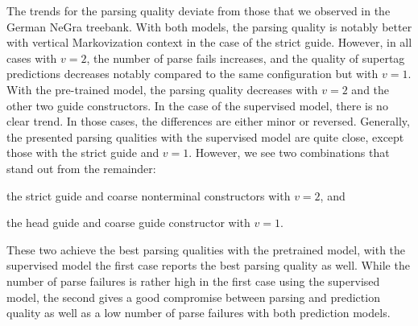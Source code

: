 \documentclass[../../document.tex]{subfiles}
\begin{document}
    The trends for the parsing quality deviate from those that we observed in the German NeGra treebank.
    With both models, the parsing quality is notably better with vertical Markovization context in the case of the strict guide.
    However, in all cases with $v=2$, the number of parse fails increases, and the quality of supertag predictions decreases notably compared to the same configuration but with $v=1$.
    With the pre-trained model, the parsing quality decreases with $v=2$ and the other two guide constructors.
    In the case of the supervised model, there is no clear trend. In those cases, the differences are either minor or reversed.
    Generally, the presented parsing qualities with the supervised model are quite close, except those with the strict guide and $v=1$.
    However, we see two combinations that stand out from the remainder:
    \begin{compactitem}
        \item the strict guide and coarse nonterminal constructors with $v=2$, and
        \item the head guide and coarse guide constructor with $v=1$.
    \end{compactitem}
    These two achieve the best parsing qualities with the pretrained model, with the supervised model the first case reports the best parsing quality as well.
    While the number of parse failures is rather high in the first case using the supervised model, the second gives a good compromise between parsing and prediction quality as well as a low number of parse failures with both prediction models.
\end{document}
